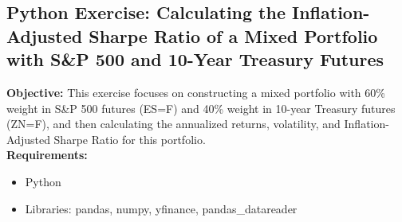 \documentclass{article}
\begin{document}
\subsection{Python Exercise: Calculating the Inflation-Adjusted Sharpe Ratio of a Mixed Portfolio with S\&P 500 and 10-Year Treasury Futures}

\textbf{Objective:} This exercise focuses on constructing a mixed portfolio with 60\% weight in S\&P 500 futures (ES=F) and 40\% weight in 10-year Treasury futures (ZN=F), and then calculating the annualized returns, volatility, and Inflation-Adjusted Sharpe Ratio for this portfolio. \\

\textbf{Requirements:}
\begin{itemize}
    \item Python
    \item Libraries: pandas, numpy, yfinance, pandas\_datareader
\end{itemize}
\end{document}
